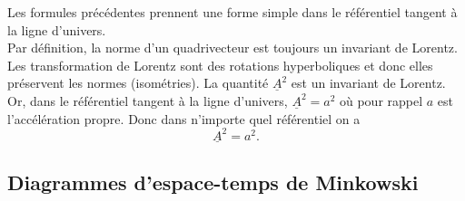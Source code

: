 \documentclass[a4paper,11pt]{report}
\theoremstyle{definition}
\theoremstyle{plain}
\theoremstyle{definition}
\theoremstyle{remark}
\begin{document}
            Les formules précédentes prennent une forme simple dans le référentiel tangent à la ligne d'univers.\\
            
            Par définition, la norme d'un quadrivecteur est toujours un invariant de Lorentz. Les transformation de Lorentz sont des rotations hyperboliques et donc elles préservent les normes (isométries). La quantité $\underline{A}^2$ est un invariant de Lorentz. Or, dans le référentiel tangent à la ligne d'univers, $\underline{A}^2 = a^2$ où pour rappel $a$ est l'accélération propre. Donc dans n'importe quel référentiel on a
            \begin{equation}
                \underline{A}^2 = a^2.
            \end{equation}
        
        \subsection{Diagrammes d'espace-temps de Minkowski}
        
\end{document}
